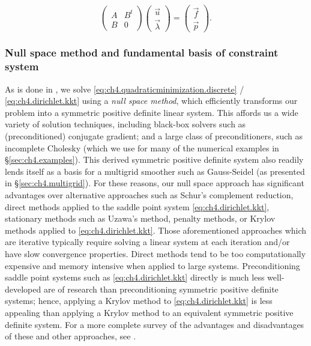 \begin{equation} \label{eq:ch4.dirichlet.kkt}
\begin{pmatrix} A & B^t \\ B & 0 \end{pmatrix} \begin{pmatrix} \vec{u} \\ \vec{\lambda} \end{pmatrix} = \begin{pmatrix} \vec{f} \\ \vec{p} \end{pmatrix}.
\end{equation}

\subsubsection{Null space method and fundamental basis of constraint system} \label{subsubsec:ch4.nullspacemethod}

As is done in \cite{Bedrossian10}, we solve \eqref{eq:ch4.quadraticminimization.discrete} / \eqref{eq:ch4.dirichlet.kkt} using a \emph{null space method}, which efficiently transforms our problem into a symmetric positive definite linear system. This affords us a wide variety of solution techniques, including black-box solvers such as (preconditioned) conjugate gradient; and a large class of preconditioners, such as incomplete Cholesky (which we use for many of the numerical examples in \S\ref{sec:ch4.examples}). This derived symmetric positive definite system also readily lends itself as a basis for a multigrid smoother such as Gauss-Seidel (as presented in \S\ref{sec:ch4.multigrid}). For these reasons, our null space approach has significant advantages over alternative approaches such as Schur's complement reduction, direct methods applied to the saddle point system \eqref{eq:ch4.dirichlet.kkt}, stationary methods such as Uzawa's method, penalty methods, or Krylov methods applied to \eqref{eq:ch4.dirichlet.kkt}. Those aforementioned approaches which are iterative typically require solving a linear system at each iteration and/or have slow convergence properties. Direct methods tend to be too computationally expensive and memory intensive when applied to large systems. Preconditioning saddle point systems such as \eqref{eq:ch4.dirichlet.kkt} directly is much less well-developed are of research than preconditioning symmetric positive definite systems; hence, applying a Krylov method to \eqref{eq:ch4.dirichlet.kkt} is less appealing than applying a Krylov method to an equivalent symmetric positive definite system. For a more complete survey of the advantages and disadvantages of these and other approaches, see \cite{Benzi05}.

